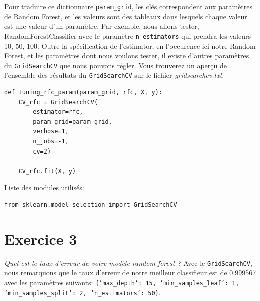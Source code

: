 \documentclass[a4paper, 12pt, oneside]{book}
\begin{document}
Pour traduire ce dictionnaire \texttt{param\_grid}, les clés correspondent aux paramètres de Random Forest, et les valeurs sont des tableaux dans lesquels chaque valeur est une valeur d'un paramètre. Par exemple, nous allons tester, RandomForestClassifier avec le paramètre \texttt{n\_estimators} qui prendra les valeurs 10, 50, 100. 
Outre la spécification de l'estimator, en l'occurence ici notre Random Forest, et les paramètres dont nous voulons tester, il existe d'autres paramètres du \texttt{GridSearchCV} que nous pouvons régler.
\newline
Vous trouverez un aperçu de l'ensemble des résultats du \texttt{GridSearchCV} sur le fichier \textit{gridsearchcv.txt}.
\begin{verbatim}
def tuning_rfc_param(param_grid, rfc, X, y):
    CV_rfc = GridSearchCV(
        estimator=rfc, 
        param_grid=param_grid,
        verbose=1,
        n_jobs=-1,
        cv=2)

    CV_rfc.fit(X, y)
\end{verbatim}

Liste des modules utilisés: 
\begin{verbatim}
from sklearn.model_selection import GridSearchCV
\end{verbatim}



\section{Exercice 3}
\textit{Quel est le taux d'erreur de votre modèle random forest ?}
\newline \newline
Avec le \texttt{GridSearchCV}, nous remarquons que le taux d'erreur de notre meilleur classifieur est de 0.999567 avec les paramètres suivants: \texttt{\{'max\_depth': 15, 'min\_samples\_leaf': 1, 'min\_samples\_split': 2, 'n\_estimators': 50\}}.
\end{document}
